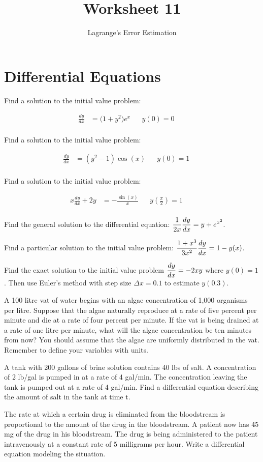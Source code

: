\documentclass[paper=letter, 11pt]{article}
\title{Worksheet 11}
\subtitle{Lagrange's Error Estimation}
\newcommand{\IVProb}[1]{
	\begin{minipage}{0.5\textwidth}
		\Prob Find a solution to the initial value problem:
	\end{minipage}%
	\begin{minipage}{0.5\textwidth}
		\begin{align*}
			#1
		\end{align*}
	\end{minipage}
}
\begin{document}
\maketitle

\section*{Differential Equations}

\IVProb{
	\frac{dy}{dx} &= \Big(1 + y^2\Big)e^x && y(0) = 0 && \\
}\vfill

\IVProb{
	\frac{dy}{dx} &=  \left(y^2 - 1\right)\cos(x) && y(0) = 1 && \\
}\vfill


\IVProb{
	x\frac{dy}{dx} + 2y &= -\frac{\sin(x)}{x}  && y\left(\frac{\pi}{2}\right) = 1 && \\
}\vfill

\newpage

\Prob Find the general solution to the differential equation: \quad $\displaystyle \frac{1}{2x}\frac{dy}{dx} = y + e^{x^2}$.\vfill

\Prob Find a particular solution to the initial value problem: \quad $\displaystyle \frac{1 + x^3}{3x^2}\frac{dy}{dx} = 1 - y(x)$.\vfill

\Prob Find the exact solution to the initial value problem $\displaystyle\frac{dy}{dx} = -2xy$ where $y(0) = 1$.  Then use Euler's method with step size $\Delta x = 0.1$ to estimate $y(0.3)$.\vfill

\newpage

\Prob A 100 litre vat of water begins with an algae concentration of 1,000 organisms per litre. 
Suppose that the algae naturally reproduce at a rate of five percent per minute and die
at a rate of four percent per minute. If the vat is being drained at a rate of one litre
per minute, what will the algae concentration be ten minutes from now? You should
assume that the algae are uniformly distributed in the vat. Remember to define your variables with units.\vfill

\Prob A tank with 200 gallons of brine solution contains 40 lbs of salt. A concentration of
2 lb/gal is pumped in at a rate of 4 gal/min. The concentration leaving the tank is
pumped out at a rate of 4 gal/min. Find a differential equation describing the amount
of salt in the tank at time t.\vfill

\Prob The rate at which a certain drug is eliminated from the bloodstream is proportional to
the amount of the drug in the bloodstream. A patient now has 45 mg of the drug in his
bloodstream. The drug is being administered to the patient intravenously at a constant
rate of 5 milligrams per hour. Write a differential equation modeling the situation.\vfill
\end{document}
